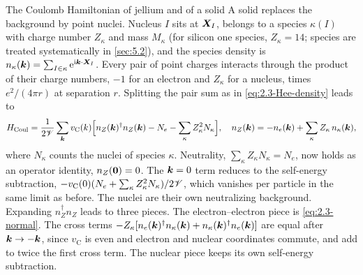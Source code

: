 \begin{workedexample}{The Coulomb Hamiltonian of jellium and of a solid}
A solid replaces the background by point nuclei. Nucleus $I$ sits at $\bm{X}_I$, belongs to a species $\kappa(I)$ with charge number $Z_\kappa$ and mass $M_\kappa$ (for silicon one species, $Z_\kappa = 14$; species are treated systematically in \cref{sec:5.2}), and the species density is $n_\kappa(\bm{k}) = \sum_{I\in\kappa}\mathrm{e}^{\mathrm{i}\bm{k}\cdot\bm{X}_I}$. Every pair of point charges interacts through the product of their charge numbers, $-1$ for an electron and $Z_\kappa$ for a nucleus, times $e^2/(4\pi r)$ at separation $r$. Splitting the pair sum as in \cref{eq:2.3-Hee-density} leads to
\begin{equation*}
  H_{\mathrm{Coul}} = \frac{1}{2\mathscr{V}}\sum_{\bm{k}}v_{\mathrm{C}}(k)\Bigl[n_Z(\bm{k})^\dagger n_Z(\bm{k}) - N_e - \sum_\kappa Z_\kappa^2N_\kappa\Bigr], \quad
  n_Z(\bm{k}) = -n_e(\bm{k}) + \sum_\kappa Z_\kappa\,n_\kappa(\bm{k}),
\end{equation*}
where $N_\kappa$ counts the nuclei of species $\kappa$. Neutrality, $\sum_\kappa Z_\kappa N_\kappa = N_e$, now holds as an operator identity, $n_Z(\bm{0}) = 0$. The $\bm{k} = 0$ term reduces to the self-energy subtraction, $-v_{\mathrm{C}}(0)(N_e + \sum_\kappa Z_\kappa^2N_\kappa)/2\mathscr{V}$, which vanishes per particle in the same limit as before. The nuclei are their own neutralizing background. Expanding $n_Z^\dagger n_Z$ leads to three pieces. The electron--electron piece is \cref{eq:2.3-normal}. The cross terms $-Z_\kappa[n_e(\bm{k})^\dagger n_\kappa(\bm{k}) + n_\kappa(\bm{k})^\dagger n_e(\bm{k})]$ are equal after $\bm{k} \to -\bm{k}$, since $v_{\mathrm{C}}$ is even and electron and nuclear coordinates commute, and add to twice the first cross term. The nuclear piece keeps its own self-energy subtraction.
\end{workedexample}


